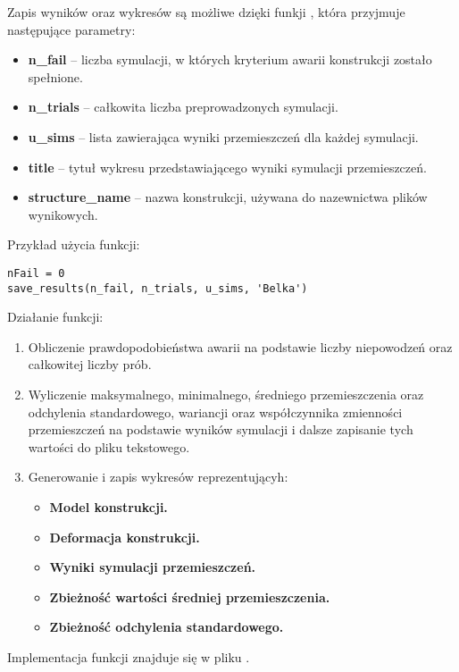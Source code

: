 Zapis wyników oraz wykresów są możliwe dzięki funkji , która przyjmuje następujące parametry:
\begin{itemize}
    \item \textbf{n\_fail} – liczba symulacji, w których kryterium awarii konstrukcji zostało spełnione.
    \item \textbf{n\_trials} – całkowita liczba preprowadzonych symulacji.
    \item \textbf{u\_sims} – lista zawierająca wyniki przemieszczeń dla każdej symulacji.
    \item \textbf{title} – tytuł wykresu przedstawiającego wyniki symulacji przemieszczeń.
    \item \textbf{structure\_name} – nazwa konstrukcji, używana do nazewnictwa plików wynikowych.
\end{itemize}
Przykład użycia funkcji:

\begin{lstlisting}
nFail = 0
save_results(n_fail, n_trials, u_sims, 'Belka')
\end{lstlisting}
Działanie funkcji:

\begin{enumerate}
    \item Obliczenie prawdopodobieństwa awarii na podstawie liczby niepowodzeń oraz całkowitej liczby prób.
    \item Wyliczenie maksymalnego, minimalnego, średniego przemieszczenia oraz odchylenia standardowego, wariancji oraz współczynnika zmienności przemieszczeń na podstawie wyników symulacji i dalsze zapisanie tych wartości do pliku tekstowego.
    \item Generowanie i zapis wykresów reprezentującyh:
    \begin{itemize}
        \item \textbf{Model konstrukcji.}
        \item \textbf{Deformacja konstrukcji.}
        \item \textbf{Wyniki symulacji przemieszczeń.}
        \item \textbf{Zbieżność wartości średniej przemieszczenia.}
        \item \textbf{Zbieżność odchylenia standardowego.}
    \end{itemize}
\end{enumerate}
Implementacja funkcji znajduje się w pliku .
